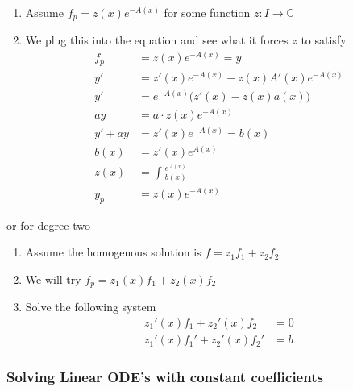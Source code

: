 \documentclass[8pt]{extarticle}
\newcommand{\C}{{\mathbb C}}
\newcommand{\ra}{{\rightarrow}}
\begin{document}
\begin{multicols*}{3}
  \begin{enumerate}[label=(\arabic*)]
    \item Assume $f_p = z(x) e^{-A(x)}$ for some function
          $z: I \ra \C$
    \item We plug this into the equation and see what
          it forces $z$ to satisfy
          \begin{align*}
            f_p     & = z(x) e^{-A(x)} = y                      \\
            y'      & = z'(x) e^{-A(x)} - z(x) A'(x) e^{-A(x)}  \\
            y'      & = e^{-A(x)} \Big (z'(x) - z(x) a(x)\Big ) \\
            ay      & = a \cdot z(x) e^{-A(x)}                  \\
            y' + ay & = z'(x) e^{-A(x)} = b(x)                  \\
            b(x)    & = z'(x) e^{A(x)}                          \\
            z(x)    & = \int \frac{e^{A(x)}}{b(x)}              \\
            y_p     & = z(x) e^{-A(x)}
          \end{align*}
  \end{enumerate}
  or for degree two
  \begin{enumerate}[label=(\arabic*)]
    \item Assume the homogenous solution is $f = z_1 f_1 + z_2 f_2$
    \item We will try $f_p = z_1(x) f_1 + z_2(x) f_2$
    \item Solve the following system
          \begin{align*}
            z_1'(x) f_1 + z_2'(x) f_2   & = 0 \\
            z_1'(x) f_1' + z_2'(x) f_2' & = b 
          \end{align*}
  \end{enumerate}

    \subsubsection {Solving Linear ODE's with constant coefficients}
  

\end{multicols*}
\end{document}
